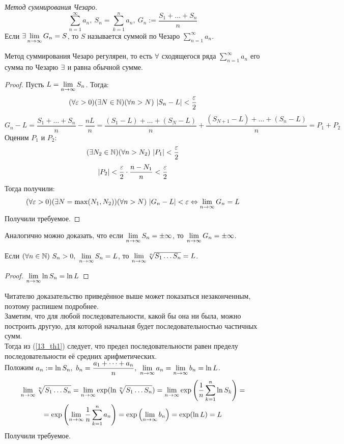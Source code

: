 \begin{definition}
	\textit{Метод суммирования Чезаро}. 
	\[\sum_{n=1}^\infty a_n,\ S_n=\sum_{k=1}^na_n,\ G_n:=\frac{S_1+\dots+S_n}{n}\]
	Если $\ex\lim_{n\ra\infty}G_n=S$, то $S$ называется суммой по Чезаро $\sum_{n=1}^\infty a_n$.
\end{definition}
\begin{theorem}\label{13_th1}
	Метод суммирования Чезаро регулярен, то есть $\forall$ сходящегося ряда $\sum_{n=1}^\infty a_n$ его сумма по Чезарю $\exists$ и равна обычной сумме.
\end{theorem}
\begin{proof}
	Пусть $L=\lim_{n\ra\infty}S_n$. Тогда:
	\[(\fa\eps>0)(\ex N\in\N)(\fa n>N)\ |S_n-L|<\frac\eps2\]
	\[G_n-L=\frac{S_1+\dots+S_n}n-\frac{nL}{n}=\frac{(S_1-L)+\dots+(S_N-L)}{n}+\frac{(S_{N+1}-L)+\dots+(S_n-L)}{n}=P_1+P_2\]
	Оценим $P_1$ и $P_2$:
	\[(\ex N_2\in\N)(\fa n>N_2)\ |P_1|<\frac\eps2\]
	\[|P_2|<\frac{\varepsilon}2\cdot\frac{n-N_1}{n}<\frac{\varepsilon}2\]
	Тогда получили:
	\[(\fa\eps>0)(\ex N=\max(N_1,N_2))(\fa n>N)\ |G_n-L|<\eps\lra\lim_{n\ra\infty}G_n=L\]
	Получили требуемое.
\end{proof}
\begin{note}
	Аналогично можно доказать, что если $\lim_{n\ra\infty}S_n=\pm\infty$, то
	$\lim_{n\ra\infty}G_n=\pm\infty$.
\end{note}
\begin{corollary}\label{13_cl1}
	Если $(\fa n\in\N)\ S_n>0,\ \lim_{n\ra\infty}S_n=L$, то $\lim_{n\ra\infty}\sqrt[n]{S_1\dots S_n}=L$.
\end{corollary}
\begin{proof}
	$\lim_{n\ra\infty}\ln S_n=\ln L$
\end{proof}
\begin{anote}
	Читателю доказательство приведённое выше может показаться незаконченным, поэтому распишем подробнее.\\
	Заметим, что для любой последовательности, какой бы она ни была, можно построить другую, для которой начальная будет последовательностью частичных сумм.\\
	Тогда из (\ref{13_th1}) следует, что предел последовательности равен пределу последовательности её средних арифметических.\\
	Положим $\ds a_n:=\ln S_n,\ b_n=\frac{a_1+\dots+a_n}n,\ \lim_{n\ra\i}a_n=\lim_{n\ra\i}b_n=\ln L$.
	\begin{multline*}
		\lim_{n\ra\i}\sqrt[n]{S_1\dots S_n}=\lim_{n\ra\i}\exp(\ln\sqrt[n]{S_1\dots S_n})=
		\lim_{n\ra\i}\exp\left(\frac1n\sum_{k=1}^n\ln S_k\right)=\\
		=\exp\left(\lim_{n\ra\i}\frac1n\sum_{k=1}^na_n\right)=\exp\left(\lim_{n\ra\i}b_n\right)=\exp(\ln L)=L
	\end{multline*}
	Получили требуемое.
\end{anote}
